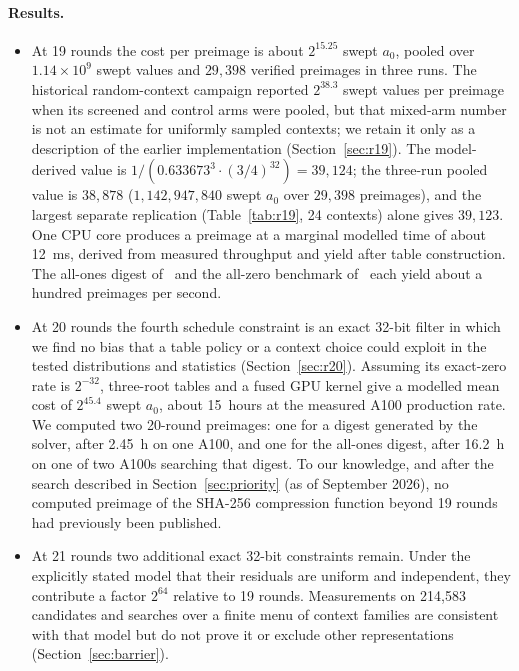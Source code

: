 \documentclass[11pt,a4paper]{article}
\begin{document}
\paragraph{Results.}
\begin{itemize}
\item At 19 rounds the cost per preimage is about $2^{15.25}$ swept $a_0$,
  pooled over $1.14\times10^{9}$ swept values and $29{,}398$ verified
  preimages in three runs.  The historical random-context campaign reported
  $2^{38.3}$ swept values per preimage when its screened and control arms were
  pooled, but that mixed-arm number is not an estimate for uniformly sampled
  contexts; we retain it only as a description of the earlier implementation
  (Section~\ref{sec:r19}).  The
  model-derived value is $1/(0.633673^3\cdot(3/4)^{32}) = 39{,}124$;
  the three-run pooled value is $38{,}878$ ($1{,}142{,}947{,}840$ swept $a_0$ over $29{,}398$ preimages), and the largest separate replication (Table~\ref{tab:r19}, 24 contexts) alone gives $39{,}123$.  One CPU core produces a preimage
  at a marginal modelled time of about 12~ms, derived from measured throughput
  and yield after table construction.  The all-ones digest of~\cite{Zaikin2026}
  and the all-zero benchmark of~\cite{Davydov2025} each yield about a hundred
  preimages per second.
\item At 20 rounds the fourth schedule constraint is an exact 32-bit filter in which we find no bias that a table policy or a
  context choice could exploit in the tested distributions and statistics
  (Section~\ref{sec:r20}).  Assuming its exact-zero rate is $2^{-32}$, three-root
  tables and a fused GPU kernel give a modelled mean cost of $2^{45.4}$ swept
  $a_0$, about 15~hours at the measured A100 production rate.  We computed two 20-round preimages: one for a
  digest generated by the solver, after 2.45~h on one A100, and one for the
  all-ones digest, after 16.2~h on one of two A100s searching that digest.  To our knowledge, and
  after the search described in Section~\ref{sec:priority} (as of September
  2026), no computed preimage of the SHA-256 compression function beyond 19
  rounds had previously been published.
\item At 21 rounds two additional exact 32-bit constraints remain.  Under the
  explicitly stated model that their residuals are uniform and independent,
  they contribute a factor $2^{64}$ relative to 19 rounds.  Measurements on
  214{,}583 candidates and searches over a finite menu of context families are
  consistent with that model but do not prove it or exclude other
  representations (Section~\ref{sec:barrier}).
\end{itemize}
\end{document}
